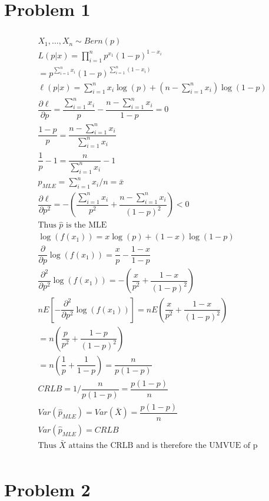 \documentclass{article}
\newcommand{\sumn}{\sum_{i=1}^{n}}
\newcommand{\prodn}{\prod_{i=1}^{n}}
\newcommand{\dll}[1]{\dfrac{\partial\ell}{\partial{#1}}}
\newcommand{\sumx}{\sum_{i=1}^{n}x_i}
\begin{document}
\begin{flushleft}

	\section*{Problem 1}
	
\begin{multline*}\\
X_1,\dots,X_n \sim Bern(p)\\
L(p|x)=\prodn p^{x_1}(1-p)^{1-x_i}\\
=p^{\sumx}(1-p)^{\sumn (1-x_i)}\\
\ell(p|x)=\sumx \log(p)+(n-\sumx)\log(1-p)\\
\dll{p}=\dfrac{\sumx}{p}-\dfrac{n-\sumx}{1-p}=0\\
\dfrac{1-p}{p}=\dfrac{n-\sumx}{\sumx}\\
\dfrac{1}{p}-1=\dfrac{n}{\sumx}-1\\
\hat{p}_{MLE}=\sumx/n=\bar{x}\\
\dll{p^2}=-\left(\dfrac{\sumx}{p^2}+\dfrac{n-\sumx}{(1-p)^2}\right)<0\\
\text{Thus } \hat{p} \text{ is the MLE}\\
\log(f(x_1))=x\log(p)+(1-x)\log(1-p)\\
\dfrac{\partial}{\partial p}\log(f(x_1))=\dfrac{x}{p}-\dfrac{1-x}{1-p}\\
\dfrac{\partial^2}{\partial p^2}\log(f(x_1))=-\left(\dfrac{x}{p^2}+\dfrac{1-x}{(1-p)^2}\right)\\
nE[-\dfrac{\partial^2}{\partial p^2}\log(f(x_1))]=nE\left(\dfrac{x}{p^2}+\dfrac{1-x}{(1-p)^2}\right)\\
=n\left(\dfrac{p}{p^2}+\dfrac{1-p}{(1-p)^2}\right)\\
=n(\dfrac{1}{p}+\dfrac{1}{1-p})=\dfrac{n}{p(1-p)}\\
CRLB=1/\dfrac{n}{p(1-p)}=\dfrac{p(1-p)}{n}\\
Var(\hat{p}_{MLE})=Var(\bar{X})=\dfrac{p(1-p)}{n}\\
Var(\hat{p}_{MLE})=CRLB\\
 \text{Thus } \bar{X} \text{ attains the CRLB and is therefore the UMVUE of p}\\
\end{multline*}

	\section*{Problem 2}
	

\end{flushleft}
\end{document}

